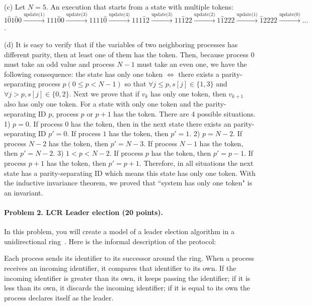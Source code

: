 \documentclass[11pt]{article}
\begin{document}
(c) Let $N=5$. An execution that starts from a state with multiple tokens: $1\hat{0}1\hat{0}0 \xrightarrow{\text{update(1)}}  111\hat{0}0 \xrightarrow{\text{update(3)}} 1111\hat{0} \xrightarrow{\text{update(4)}} 111\hat{1}2 \xrightarrow{\text{update(3)}} 11\hat{1}22 \xrightarrow{\text{update(2)}} 1\hat{1}222 \xrightarrow{\text{update(1)}} \hat{1}2222 \xrightarrow{\text{update(0)}} \dots$.

(d) It is easy to verify that if the variables of two neighboring processes has different parity, then at least one of them has the token. Then, because process $0$ must take an odd value and process $N-1$ must take an even one, we have the following consequence: the state has only one token $\iff$ there exists a parity-separating process $p (0 \le p < N-1)$ so that $\forall j \le p, s[j] \in \{1,3\}$ and $\forall j > p, s[j] \in \{0,2\}$. Next we prove that if $v_k$ has only one token, then $v_{k+1}$ also has only one token. For a state with only one token and the parity-separating ID $p$, process $p$ or $p+1$ has the token. There are 4 possible situations. 1) $p=0$. If process $0$ has the token, then in the next state there exists an parity-separating ID $p'=0$. If process $1$ has the token, then $p'=1$. 2) $p=N-2$. If process $N-2$ has the token, then $p'=N-3$. If process $N-1$ has the token, then $p'=N-2$. 3) $1<p<N-2$. If process $p$ has the token, then $p'=p-1$. If process $p+1$ has the token, then $p'=p+1$. Therefore, in all situations the next state has a parity-separating ID which means this state has only one token. With the inductive invariance theorem, we proved that ``system has only one token" is an invariant.

\paragraph{Problem 2. LCR Leader election (20 points).}
In this problem, you will create a model of a leader election algorithm in a unidirectional ring~\cite{lynch1996a}. Here is the informal description of the protocol:

Each process sends its identifier to its successor around the ring. When a process receives an incoming identifier, it compares that identifier to its own. If the incoming identifier is greater than its own, it keeps passing the identifier; if it is less than its own, it discards the incoming identifier; if it is equal to its own the process declares itself as the leader.
\end{document}
